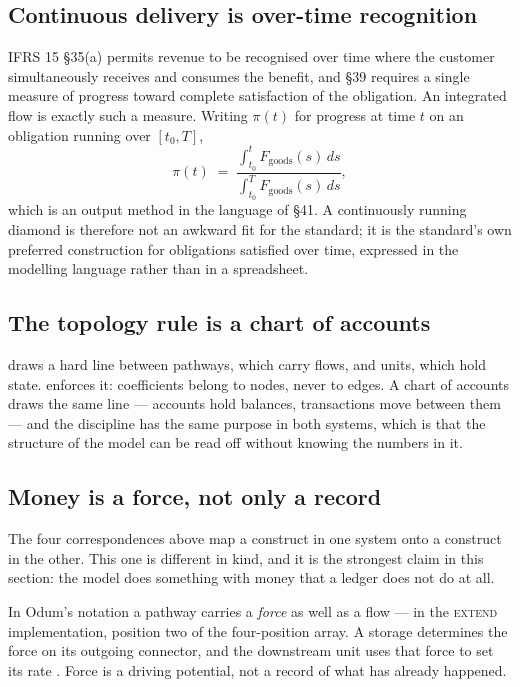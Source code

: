 \documentclass[11pt,a4paper]{article}
\begin{document}
\subsection{Continuous delivery is over-time recognition}

IFRS 15 \S35(a) permits revenue to be recognised over time where the customer simultaneously receives and consumes the benefit, and \S39 requires a single measure of progress toward complete satisfaction of the obligation. An integrated flow is exactly such a measure. Writing $\pi(t)$ for progress at time $t$ on an obligation running over $[t_0, T]$,
\begin{equation}
\pi(t) \;=\; \frac{\int_{t_0}^{t} F_{\text{goods}}(s)\, ds}{\int_{t_0}^{T} F_{\text{goods}}(s)\, ds},
\label{eq:progress}
\end{equation}
which is an output method in the language of \S41. A continuously running diamond is therefore not an awkward fit for the standard; it is the standard's own preferred construction for obligations satisfied over time, expressed in the modelling language rather than in a spreadsheet.

\subsection{The topology rule is a chart of accounts}

\esl{} draws a hard line between pathways, which carry flows, and units, which hold state. \gssk{} enforces it: coefficients belong to nodes, never to edges. A chart of accounts draws the same line --- accounts hold balances, transactions move between them --- and the discipline has the same purpose in both systems, which is that the structure of the model can be read off without knowing the numbers in it.

\subsection{Money is a force, not only a record}
\label{sec:moneyforce}

The four correspondences above map a construct in one system onto a construct in the other. This one is different in kind, and it is the strongest claim in this section: the model does something with money that a ledger does not do at all.

In Odum's notation a pathway carries a \emph{force} as well as a flow --- in the \textsc{extend} implementation, position two of the four-position array. A storage determines the force on its outgoing connector, and the downstream unit uses that force to set its rate \citep{odum2000}. Force is a driving potential, not a record of what has already happened.
\end{document}
